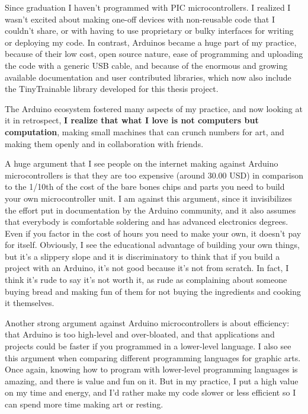 Since graduation I haven't programmed with \acrshort{PIC} microcontrollers. I realized I wasn't excited about making one-off devices with non-reusable code that I couldn't share, or with having to use proprietary or bulky interfaces for writing or deploying my code. In contrast, Arduinos became a huge part of my practice, because of their low cost, open source nature, ease of programming and uploading the code with a generic USB cable, and because of the enormous and growing available documentation and user contributed libraries, which now also include the TinyTrainable library developed for this thesis project.

The Arduino ecosystem fostered many aspects of my practice, and now looking at it in retrospect, \textbf{I realize that what I love is not computers but computation}, making small machines that can crunch numbers for art, and making them openly and in collaboration with friends.

A huge argument that I see people on the internet making against Arduino microcontrollers is that they are too expensive (around 30.00 USD) in comparison to the 1/10th of the cost of the bare bones chips and parts you need to build your own microcontroller unit. I am against this argument, since it invisibilizes the effort put in documentation by the Arduino community, and it also assumes that everybody is comfortable soldering and has advanced electronics degrees. Even if you factor in the cost of hours you need to make your own, it doesn't pay for itself. Obviously, I see the educational advantage of building your own things, but it's a slippery slope and it is discriminatory to think that if you build a project with an Arduino, it's not good because it's not from scratch. In fact, I think it's rude to say it's not worth it, as rude as complaining about someone buying bread and making fun of them for not buying the ingredients and cooking it themselves.

Another strong argument against Arduino microcontrollers is about efficiency: that Arduino is too high-level and over-bloated, and that applications and projects could be faster if you programmed in a lower-level language. I also see this argument when comparing different programming languages for graphic arts. Once again, knowing how to program with lower-level programming languages is amazing, and there is value and fun on it. But in my practice, I put a high value on my time and energy, and I'd rather make my code slower or less efficient so I can spend more time making art or resting.

